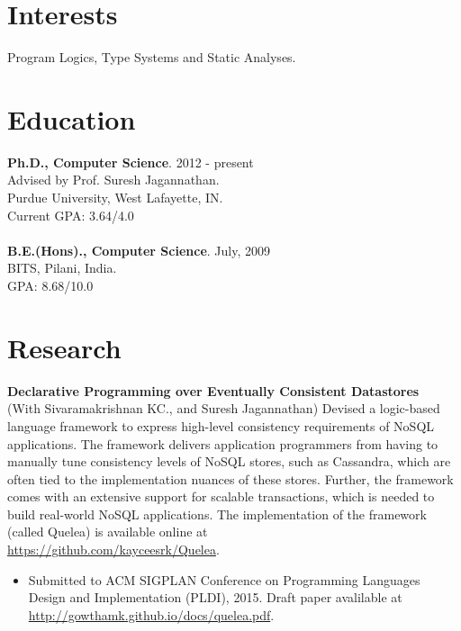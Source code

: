 \documentclass[margin,line]{res}
\begin{document}
 
 
 
\address{http://gowthamk.github.io \hspace{1.25in} gkaki@purdue.edu
          \hspace{1.25in} (201) 417 1775 }

 
\begin{resume} 
 
\section{Interests} 
Program Logics, Type Systems and Static Analyses.

\section{Education} 
{\bf Ph.D., Computer Science}. \hfill 2012 - present\\
Advised by Prof. Suresh Jagannathan.\\
Purdue University, West Lafayette, IN.\\
Current GPA: 3.64/4.0 \\
\\
{\bf B.E.(Hons)., Computer Science}. \hfill July, 2009\\
BITS, Pilani, India.\\
GPA: 8.68/10.0
 

\section{Research}
 {\bf Declarative Programming over Eventually Consistent Datastores} \\
 (With Sivaramakrishnan KC., and Suresh Jagannathan) Devised a
 logic-based language framework to express high-level consistency
 requirements of NoSQL applications. The framework delivers
 application programmers from having to manually tune consistency
 levels of NoSQL stores, such as Cassandra, which are often tied to
 the implementation nuances of these stores. Further, the framework
 comes with an extensive support for scalable transactions, which is
 needed to build real-world NoSQL applications. The implementation of
 the framework (called {\sc Quelea}) is available online at\\
 \url{https://github.com/kayceesrk/Quelea}.
 \begin{itemize}
 \item Submitted to ACM SIGPLAN Conference on Programming Languages
 Design and Implementation (PLDI), 2015. Draft paper avalilable at
 \url{http://gowthamk.github.io/docs/quelea.pdf}.
 \end{itemize}



\end{resume}
\end{document}
